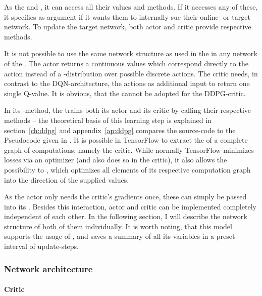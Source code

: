 As the    and , it can access all their values and methods. If it accesses any of these, it specifies as argument if it wants them to internally sue their online- or target network. To update the target network, both actor and critic provide respective methods.

It is not possible to use the same network structure as used in the  in any network of the . The actor returns a continuous values which correspond directly to the action instead of a -distribution over possible discrete actions. The critic needs, in contrast to the DQN-architecture, the actions as additional input to return one single Q-value. It is obvious, that the  cannot be adopted for the DDPG-critic.

In its -method, the  trains both its actor and its critic by calling their respective methods -- the theoretical basis of this learning step is explained in section~\ref{ch:ddpg} and appendix~\ref{ap:ddpg} compares the source-code to the Pseudocode given in \cite{lillicrap_continuous_2015}. It is possible in TensorFlow to extract the  of a complete graph of computations, namely the critic. While normally TensorFlow minimizes losses via an optimizer (and also does so in the critic), it also allows the possibility to , which optimizes all elements of its respective computation graph into the direction of the supplied values. 

As the actor only needs the critic's gradients once, these can simply be passed into its . Besides this interaction, actor and critic can be implemented completely independent of each other. In the following section, I will describe the network structure of both of them individually. It is worth noting, that this model supports the usage of , and saves a summary of all its variables in a preset interval of update-steps.

\subsubsection{Network architecture}

\paragraph{Critic}

